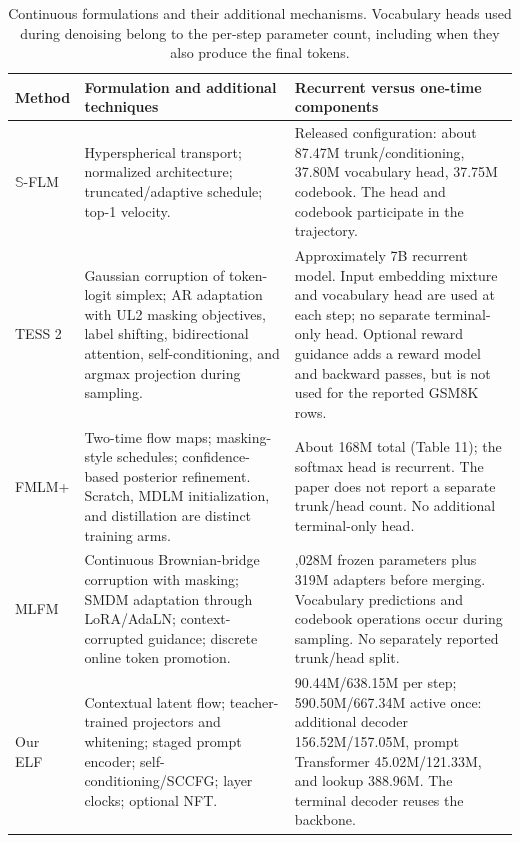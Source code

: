 \begin{table}[ht]
\caption{Continuous formulations and their additional mechanisms. Vocabulary heads used during denoising belong to the per-step parameter count, including when they also produce the final tokens.}
\label{tab:continuousmechanisms}
\centering\small
\setlength{\tabcolsep}{4pt}
\begin{tabular}{>{\raggedright\arraybackslash}p{1.65cm}>{\raggedright\arraybackslash}p{5.75cm}>{\raggedright\arraybackslash}p{5.7cm}}
\toprule
Method & Formulation and additional techniques & Recurrent versus one-time components\\
\midrule
$\mathbb S$-FLM & Hyperspherical transport; normalized architecture; truncated/adaptive schedule; top-1 velocity. & Released configuration: about 87.47M trunk/conditioning, 37.80M vocabulary head, 37.75M codebook. The head and codebook participate in the trajectory.\\
TESS 2 & Gaussian corruption of token-logit simplex; AR adaptation with UL2 masking objectives, label shifting, bidirectional attention, self-conditioning, and argmax projection during sampling. & Approximately 7B recurrent model. Input embedding mixture and vocabulary head are used at each step; no separate terminal-only head. Optional reward guidance adds a reward model and backward passes, but is not used for the reported GSM8K rows.\\
FMLM+ & Two-time flow maps; masking-style schedules; confidence-based posterior refinement. Scratch, MDLM initialization, and distillation are distinct training arms. & About 168M total (Table 11); the softmax head is recurrent. The paper does not report a separate trunk/head count. No additional terminal-only head.\\
MLFM & Continuous Brownian-bridge corruption with masking; SMDM adaptation through LoRA/AdaLN; context-corrupted guidance; discrete online token promotion. & 1,028M frozen parameters plus 319M adapters before merging. Vocabulary predictions and codebook operations occur during sampling. No separately reported trunk/head split.\\
Our ELF & Contextual latent flow; teacher-trained projectors and whitening; staged prompt encoder; self-conditioning/SCCFG; layer clocks; optional NFT. & 90.44M/638.15M per step; 590.50M/667.34M active once: additional decoder 156.52M/157.05M, prompt Transformer 45.02M/121.33M, and lookup 388.96M. The terminal decoder reuses the backbone.\\
\bottomrule
\end{tabular}
\end{table}

